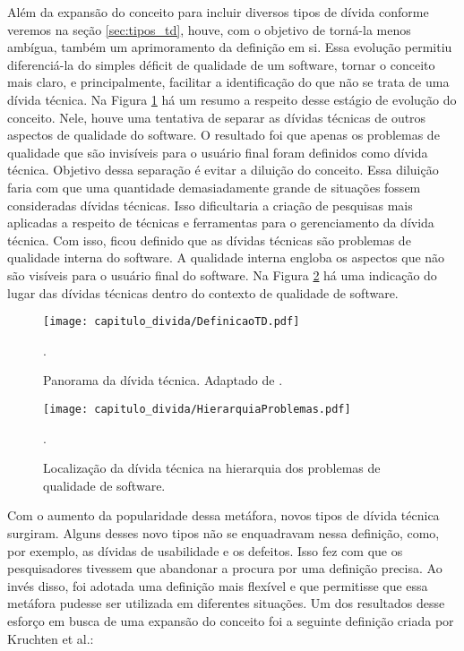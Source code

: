 Além da expansão do conceito para incluir diversos tipos de dívida conforme veremos na seção \ref{sec:tipos_td}, houve, com o objetivo de torná-la menos ambígua, também um aprimoramento da definição em si. Essa evolução permitiu diferenciá-la do simples déficit de qualidade de um software, tornar o conceito mais claro, e principalmente, facilitar a identificação do que não se trata de uma dívida técnica. Na Figura \ref{fig:cap1_panorama_td} há um resumo a respeito desse estágio de evolução do conceito. Nele, houve uma tentativa de separar as dívidas técnicas de outros aspectos de qualidade do software. O resultado foi que apenas os problemas de qualidade que são invisíveis para o usuário final foram definidos como dívida técnica. Objetivo dessa separação é evitar a diluição do conceito. Essa diluição faria com que uma quantidade demasiadamente grande de situações fossem consideradas dívidas técnicas. Isso dificultaria a criação de pesquisas mais aplicadas a respeito de técnicas e ferramentas para o gerenciamento da dívida técnica. Com isso, ficou definido que as dívidas técnicas são problemas de qualidade interna do software. A qualidade interna engloba os aspectos que não são visíveis para o usuário final do software\cite{al2010quality}. Na Figura \ref{fig:cap1_hierarquia_qualidade} há uma indicação do lugar das dívidas técnicas dentro do contexto de qualidade de software.


 \begin{figure}[H]
  \centering
  \texttt{[image: capitulo\_divida/DefinicaoTD.pdf]} 
  \caption{Panorama da dívida técnica. Adaptado de \cite{kruchten2013technical}. }.
  \label{fig:cap1_panorama_td} 
\end{figure}

 \begin{figure}[H]
  \centering
  \texttt{[image: capitulo\_divida/HierarquiaProblemas.pdf]} 
  \caption{Localização da dívida técnica na hierarquia dos problemas de qualidade de software. }.
  \label{fig:cap1_hierarquia_qualidade} 
\end{figure}


Com o aumento da popularidade dessa metáfora, novos tipos de dívida técnica surgiram. Alguns desses novo tipos não se enquadravam nessa definição, como, por exemplo, as dívidas de usabilidade e os defeitos. Isso fez com que os pesquisadores tivessem que abandonar a procura por uma definição precisa. Ao invés disso, foi adotada uma definição mais flexível e que permitisse que essa metáfora pudesse ser utilizada em diferentes situações. Um dos resultados desse esforço em busca de uma expansão do conceito foi a seguinte definição criada por Kruchten et al.\cite{kruchten2013technical}:

